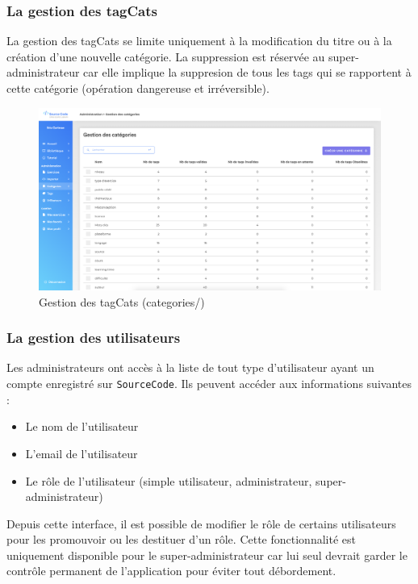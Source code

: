 \subsubsection{La gestion des \glspl{tagCat}}

La gestion des \glspl{tagCat} se limite uniquement à la modification du titre ou à la création d'une nouvelle catégorie. La suppression est réservée au super-administrateur car elle implique la suppresion de tous les \glspl{tag} qui se rapportent à cette catégorie (opération dangereuse et irréversible).

\begin{figure}[H]
    \includegraphics[width=\textwidth,height=\textheight,keepaspectratio]{images/client/categories-admin.png}
    \centering
    \caption[SourceCode : gestion des \glspl{tagCat}]{Gestion des \glspl{tagCat} (categories/)}
\end{figure}

\subsubsection{La gestion des utilisateurs}

Les administrateurs ont accès à la liste de tout type d'utilisateur ayant un compte enregistré sur \texttt{SourceCode}. Ils peuvent accéder aux informations suivantes :

\begin{itemize}
    \item Le nom de l'utilisateur
    \item L'email de l'utilisateur
    \item Le rôle de l'utilisateur (simple utilisateur, administrateur, super-administrateur)
\end{itemize}

Depuis cette interface, il est possible de modifier le rôle de certains utilisateurs pour les promouvoir ou les destituer d'un rôle. Cette fonctionnalité est uniquement disponible pour le super-administrateur car lui seul devrait garder le contrôle permanent de l'application pour éviter tout débordement.

